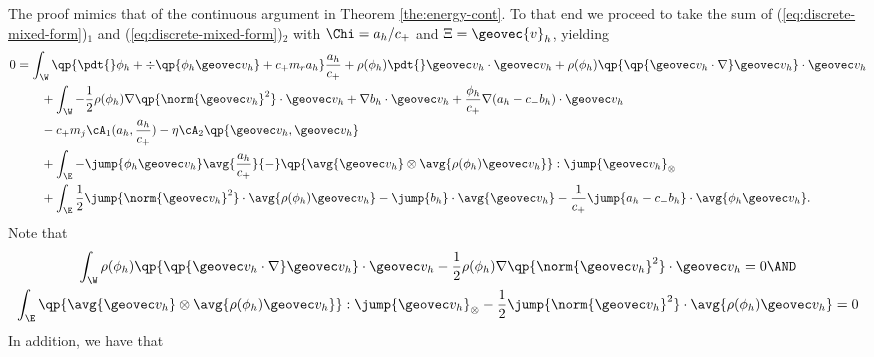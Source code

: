 \documentclass[final]{amsart}
\numberwithin{equation}{section}
\begin{document}
\begin{Proof}
  The proof mimics that of the continuous argument in Theorem
  \ref{the:energy-cont}. To that end we proceed to take the sum of
  (\ref{eq:discrete-mixed-form})$_1$ and
  (\ref{eq:discrete-mixed-form})$_2$ with $\Chi = a_h/c_+$ and $\Xi =
  {\geovec{v}}_h$, yielding
  \begin{equation}
    \label{eq:energy-1}
    \begin{split}
      0 
      &=
      \int_\W \qp{\pdt{}\phi_h + \div\qp{\phi_h\geovec v_h} + c_ + m_r a_h} \frac{a_h}{c_+} 
      +
      \rho(\phi_h) \pdt{}\geovec v_h \cdot \geovec v_h
      +
      \rho(\phi_h) \qp{ \qp{\geovec v_h \cdot \nabla }\geovec v_h} \cdot \geovec v_h
      \\
      &\qquad
      +
      \int_\W 
      -
      \frac{1}{2} \rho(\phi_h) \nabla\qp{\norm{\geovec v_h}^2} \cdot \geovec v_h
      +
      \nabla b_h \cdot \geovec v_h
      +
      \frac{\phi_h}{c_+}\nabla(a_h - c_- b_h) \cdot \geovec v_h
      \\
      &\qquad
      - 
      c_+ m_j \cA_1(a_h,\frac{a_h}{c_+}) 
      -
      \eta\cA_2\qp{{\geovec v_h},{\geovec v_h}}
      \\
      & \qquad 
      +
      \int_\E -\jump{\phi_h \geovec v_h}\avg{\frac{a_h}{c_+}}
      {-}
      \qp{\avg{ \geovec v_h} \otimes \avg{ \rho(\phi_h) \geovec v_h}}: \jump{\geovec v_h}_\otimes 
      \\ 
      &\qquad
      +
      \int_\E
      \frac{1}{2} \jump{\norm{\geovec v_h}^2}\cdot \avg{\rho(\phi_h) \geovec v_h}
      -
      \jump{b_h} \cdot \avg{\geovec v_h}
      -
      \frac{1}{c_+}\jump{ a_h - c_- b_h} \cdot \avg{\phi_h \geovec v_h}.
    \end{split}
  \end{equation}
  Note that
  \begin{gather}
    \label{eq:energy-2}
      \int_\W \rho(\phi_h) \qp{ \qp{\geovec v_h \cdot \nabla }\geovec
        v_h} \cdot \geovec v_h
      - \frac{1}{2} \rho(\phi_h)
      \nabla\qp{\norm{\geovec v_h}^2} \cdot \geovec v_h = 0 \AND
      \\
      \int_\E
      \qp{\avg{ \geovec v_h} \otimes \avg{ \rho(\phi_h) \geovec v_h}}:
      \jump{\geovec v_h}_\otimes - \frac{1}{2} \jump{\norm{\geovec
          v_h}^2}\cdot \avg{\rho(\phi_h) \geovec v_h} 
      = 0
    \end{gather}
    In addition, we have that
  \begin{equation}
    \label{eq:energy-3}
    \begin{split}

\end{split}
\end{equation}
\end{Proof}
\end{document}
